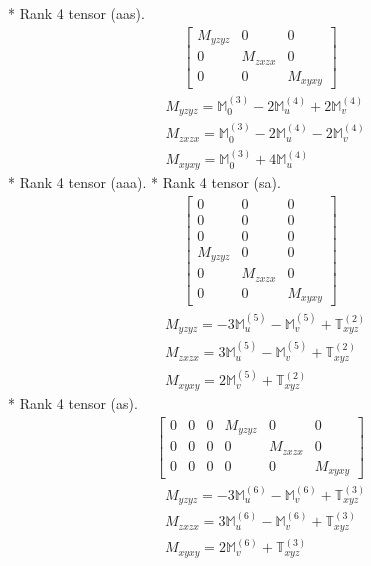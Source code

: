 \documentclass[fleqn,8pt,landscape]{jsarticle}
\begin{document}
* Rank 4 tensor (aas).
\begin{align*}
\begin{bmatrix} M_{yzyz} & 0 & 0 \\ 0 & M_{zxzx} & 0 \\ 0 & 0 & M_{xyxy} \end{bmatrix}
\end{align*}
\begin{align*}
& M_{yzyz} = \mathbb{M}_{0}^{(3)} - 2 \mathbb{M}_{u}^{(4)} + 2 \mathbb{M}_{v}^{(4)} \\
& M_{zxzx} = \mathbb{M}_{0}^{(3)} - 2 \mathbb{M}_{u}^{(4)} - 2 \mathbb{M}_{v}^{(4)} \\
& M_{xyxy} = \mathbb{M}_{0}^{(3)} + 4 \mathbb{M}_{u}^{(4)}
\end{align*}
* Rank 4 tensor (aaa).
* Rank 4 tensor (sa).
\begin{align*}
\begin{bmatrix} 0 & 0 & 0 \\ 0 & 0 & 0 \\ 0 & 0 & 0 \\ M_{yzyz} & 0 & 0 \\ 0 & M_{zxzx} & 0 \\ 0 & 0 & M_{xyxy} \end{bmatrix}
\end{align*}
\begin{align*}
& M_{yzyz} = - 3 \mathbb{M}_{u}^{(5)} - \mathbb{M}_{v}^{(5)} + \mathbb{T}_{xyz}^{(2)} \\
& M_{zxzx} = 3 \mathbb{M}_{u}^{(5)} - \mathbb{M}_{v}^{(5)} + \mathbb{T}_{xyz}^{(2)} \\
& M_{xyxy} = 2 \mathbb{M}_{v}^{(5)} + \mathbb{T}_{xyz}^{(2)}
\end{align*}
* Rank 4 tensor (as).
\begin{align*}
\begin{bmatrix} 0 & 0 & 0 & M_{yzyz} & 0 & 0 \\ 0 & 0 & 0 & 0 & M_{zxzx} & 0 \\ 0 & 0 & 0 & 0 & 0 & M_{xyxy} \end{bmatrix}
\end{align*}
\begin{align*}
& M_{yzyz} = - 3 \mathbb{M}_{u}^{(6)} - \mathbb{M}_{v}^{(6)} + \mathbb{T}_{xyz}^{(3)} \\
& M_{zxzx} = 3 \mathbb{M}_{u}^{(6)} - \mathbb{M}_{v}^{(6)} + \mathbb{T}_{xyz}^{(3)} \\
& M_{xyxy} = 2 \mathbb{M}_{v}^{(6)} + \mathbb{T}_{xyz}^{(3)}
\end{align*}
\end{document}
